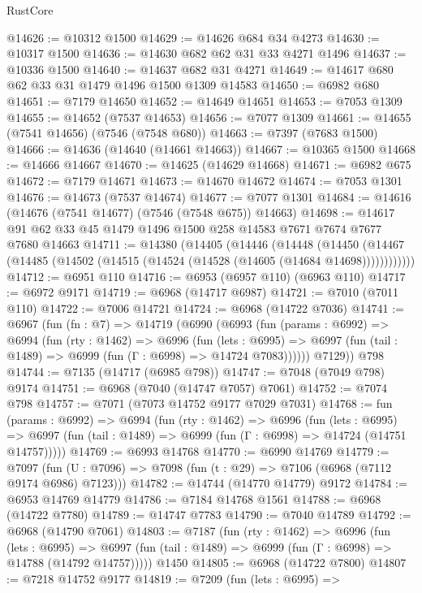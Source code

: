 \begin{lexlean}{RustCore}
\begin{coremodule}
@14626 := @10312 @1500
@14629 := @14626 @684 @34 @4273
@14630 := @10317 @1500
@14636 := @14630 @682 @62 @31 @33 @4271 @1496
@14637 := @10336 @1500
@14640 := @14637 @682 @31 @4271
@14649 := @14617 @680 @62 @33 @31 @1479 @1496 @1500 @1309 @14583
@14650 := @6982 @680
@14651 := @7179 @14650
@14652 := @14649 @14651
@14653 := @7053 @1309
@14655 := @14652 (@7537 @14653)
@14656 := @7077 @1309
@14661 := @14655 (@7541 @14656) (@7546 (@7548 @680))
@14663 := @7397 (@7683 @1500)
@14666 := @14636 (@14640 (@14661 @14663))
@14667 := @10365 @1500
@14668 := @14666 @14667
@14670 := @14625 (@14629 @14668)
@14671 := @6982 @675
@14672 := @7179 @14671
@14673 := @14670 @14672
@14674 := @7053 @1301
@14676 := @14673 (@7537 @14674)
@14677 := @7077 @1301
@14684 := @14616 (@14676 (@7541 @14677) (@7546 (@7548 @675)) @14663)
@14698 := @14617 @91 @62 @33 @45 @1479 @1496 @1500 @258 @14583 @7671 @7674 @7677 @7680 @14663
@14711 := @14380
    (@14405
      (@14446
        (@14448
          (@14450 (@14467 (@14485 (@14502 (@14515 (@14524 (@14528 (@14605 (@14684 @14698))))))))))))
@14712 := @6951 @110
@14716 := @6953 (@6957 @110) (@6963 @110)
@14717 := @6972 @9171
@14719 := @6968 (@14717 @6987)
@14721 := @7010 (@7011 @110)
@14722 := @7006 @14721
@14724 := @6968 (@14722 @7036)
@14741 := @6967
    (fun (fn : @7) =>
    @14719
      (@6990
        (@6993
          (fun (params : @6992) =>
          @6994
            (fun (rty : @1462) =>
            @6996
              (fun (lets : @6995) =>
              @6997 (fun (tail : @1489) => @6999 (fun (Γ : @6998) => @14724 @7083))))))
        @7129))
    @798
@14744 := @7135 (@14717 (@6985 @798))
@14747 := @7048 (@7049 @798) @9174
@14751 := @6968 (@7040 (@14747 @7057) @7061)
@14752 := @7074 @798
@14757 := @7071 (@7073 @14752 @9177 @7029 @7031)
@14768 := fun (params : @6992) =>
  @6994
    (fun (rty : @1462) =>
    @6996
      (fun (lets : @6995) =>
      @6997 (fun (tail : @1489) => @6999 (fun (Γ : @6998) => @14724 (@14751 @14757)))))
@14769 := @6993 @14768
@14770 := @6990 @14769
@14779 := @7097
    (fun (U : @7096) => @7098 (fun (t : @29) => @7106 (@6968 (@7112 @9174 @6986) @7123)))
@14782 := @14744 (@14770 @14779) @9172
@14784 := @6953 @14769 @14779
@14786 := @7184 @14768 @1561
@14788 := @6968 (@14722 @7780)
@14789 := @14747 @7783
@14790 := @7040 @14789
@14792 := @6968 (@14790 @7061)
@14803 := @7187
    (fun (rty : @1462) =>
    @6996
      (fun (lets : @6995) =>
      @6997 (fun (tail : @1489) => @6999 (fun (Γ : @6998) => @14788 (@14792 @14757)))))
    @1450
@14805 := @6968 (@14722 @7800)
@14807 := @7218 @14752 @9177
@14819 := @7209
    (fun (lets : @6995) =>

\end{coremodule}
\end{lexlean}
